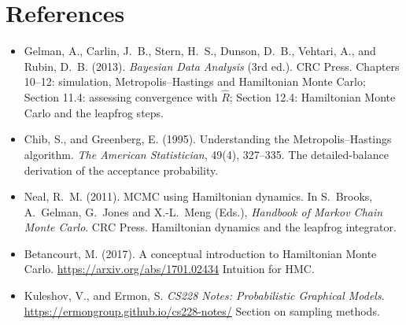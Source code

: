 \section*{References}
\begin{itemize}
\item Gelman, A., Carlin, J.~B., Stern, H.~S., Dunson, D.~B., Vehtari, A., and Rubin, D.~B. (2013). \emph{Bayesian Data Analysis} (3rd ed.). CRC Press. Chapters 10--12: simulation, Metropolis--Hastings and Hamiltonian Monte Carlo; Section 11.4: assessing convergence with $\hat R$; Section 12.4: Hamiltonian Monte Carlo and the leapfrog steps.
\item Chib, S., and Greenberg, E. (1995). Understanding the Metropolis--Hastings algorithm. \emph{The American Statistician}, 49(4), 327--335. The detailed-balance derivation of the acceptance probability.
\item Neal, R.~M. (2011). MCMC using Hamiltonian dynamics. In S.~Brooks, A.~Gelman, G.~Jones and X.-L.~Meng (Eds.), \emph{Handbook of Markov Chain Monte Carlo}. CRC Press. Hamiltonian dynamics and the leapfrog integrator.
\item Betancourt, M. (2017). A conceptual introduction to Hamiltonian Monte Carlo. \url{https://arxiv.org/abs/1701.02434} Intuition for HMC.
\item Kuleshov, V., and Ermon, S. \emph{CS228 Notes: Probabilistic Graphical Models}. \url{https://ermongroup.github.io/cs228-notes/} Section on sampling methods.
\end{itemize}


